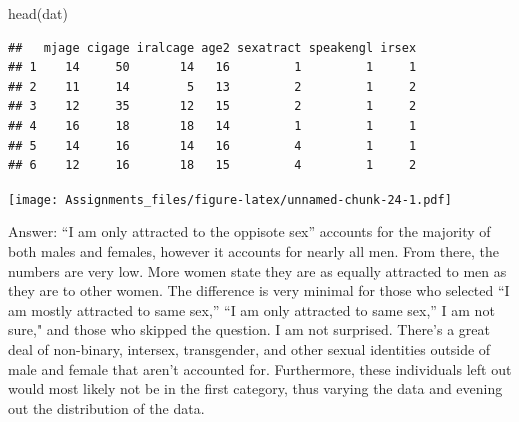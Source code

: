 \documentclass[
]{article}
\newenvironment{Shaded}{\begin{snugshade}}{\end{snugshade}}
\newcommand{\AttributeTok}[1]{\textcolor[rgb]{0.77,0.63,0.00}{#1}}
\newcommand{\CommentTok}[1]{\textcolor[rgb]{0.56,0.35,0.01}{\textit{#1}}}
\newcommand{\ConstantTok}[1]{\textcolor[rgb]{0.00,0.00,0.00}{#1}}
\newcommand{\FunctionTok}[1]{\textcolor[rgb]{0.00,0.00,0.00}{#1}}
\newcommand{\NormalTok}[1]{#1}
\newcommand{\OtherTok}[1]{\textcolor[rgb]{0.56,0.35,0.01}{#1}}
\newcommand{\SpecialCharTok}[1]{\textcolor[rgb]{0.00,0.00,0.00}{#1}}
\newcommand{\StringTok}[1]{\textcolor[rgb]{0.31,0.60,0.02}{#1}}
\begin{document}
\begin{Shaded}
\begin{Highlighting}[]
\FunctionTok{head}\NormalTok{(dat)}
\end{Highlighting}
\end{Shaded}

\begin{verbatim}
##   mjage cigage iralcage age2 sexatract speakengl irsex
## 1    14     50       14   16         1         1     1
## 2    11     14        5   13         2         1     2
## 3    12     35       12   15         2         1     2
## 4    16     18       18   14         1         1     1
## 5    14     16       14   16         4         1     1
## 6    12     16       18   15         4         1     2
\end{verbatim}

\begin{Shaded}
\end{Shaded}

\texttt{[image: Assignments\_files/figure-latex/unnamed-chunk-24-1.pdf]}

Answer: ``I am only attracted to the oppisote sex'' accounts for the
majority of both males and females, however it accounts for nearly all
men. From there, the numbers are very low. More women state they are as
equally attracted to men as they are to other women. The difference is
very minimal for those who selected ``I am mostly attracted to same
sex,'' ``I am only attracted to same sex,'' I am not sure," and those
who skipped the question. I am not surprised. There's a great deal of
non-binary, intersex, transgender, and other sexual identities outside
of male and female that aren't accounted for. Furthermore, these
individuals left out would most likely not be in the first category,
thus varying the data and evening out the distribution of the data.
\end{document}
